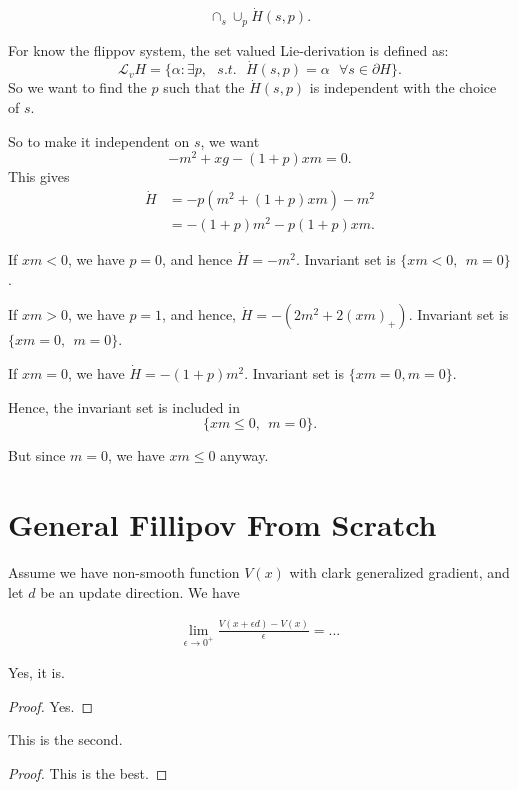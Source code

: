 \documentclass[letterpaper,11pt]{article}
\begin{document}
$$\cap_{s} \cup_{p} \dot H(s, p).$$


For know the flippov system, the set valued Lie-derivation is defined as:
$$
\mathcal L_v H  =   
\{\alpha \colon \exists p, ~~~ s.t. ~~~ \dot H(s,p) = \alpha ~~~\forall s \in \partial H \}.
$$
So we want to find the $p$ such that the $\dot H(s,p)$ is independent with the choice of $s$. 

So to make it independent on $s$, we want 
$$
-m^2 + xg -(1+p)xm  = 0.
$$
This gives
\begin{align*}
\dot H 
& = -p(m^2 + (1+p) xm)- m^2 \\
& = -(1+p)m^2 - p(1+p) xm. 
\end{align*}

If $xm <0$, we have $p=0$, and hence $\dot H = - m^2$. 
Invariant set is $\{xm < 0, ~~ m=0\}$.

If $xm >0$, we have $p = 1$, and hence, $\dot H = -(2 m^2 + 2 (xm)_+)$. Invariant set is $\{xm=0, ~~ m=0\}.$

If $xm=0$, we have $\dot H = -(1+p) m^2$. Invariant set is $\{xm=0, m = 0\}$. 

Hence, the invariant set is included in 
$$
\{xm \leq 0, ~~ m = 0\}. 
$$

But since $m=0$, we have $xm\leq 0$ anyway. 


\section{General Fillipov From Scratch}

\begin{ctheorem}
Assume we have non-smooth function $V(x)$ with clark generalized gradient, and let $d$ be an update direction. We have 
\end{ctheorem} 
\begin{cproof} 
\begin{align*}
\lim_{\epsilon \to 0^+}\frac{V(x + \epsilon d) - V(x)}{\epsilon} 
= ... 
\end{align*}  
\end{cproof}   

\begin{thm}
    Yes, it is. 
\end{thm}
\begin{proof} 
    Yes. 
\end{proof}    

\begin{theorem}
    This is the second. 
\end{theorem}
\begin{proof}
    This is the best. 
\end{proof}     
\end{document}
